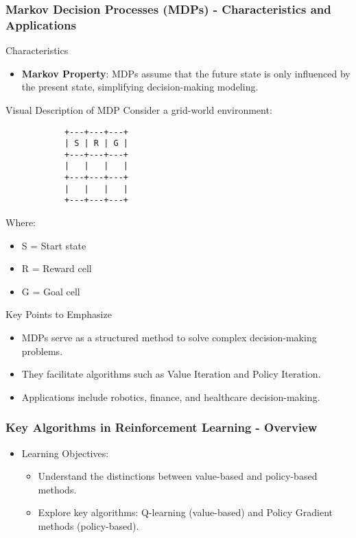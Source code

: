 \documentclass[aspectratio=169]{beamer}
\begin{document}
\begin{frame}[fragile]
    \frametitle{Markov Decision Processes (MDPs) - Characteristics and Applications}
    
    \begin{block}{Characteristics}
        \begin{itemize}
            \item \textbf{Markov Property}: MDPs assume that the future state is only influenced by the present state, simplifying decision-making modeling.
        \end{itemize}
    \end{block}

    \begin{block}{Visual Description of MDP}
        Consider a grid-world environment:
        \begin{center}
            \begin{verbatim}
            +---+---+---+
            | S | R | G |
            +---+---+---+
            |   |   |   |
            +---+---+---+
            |   |   |   |
            +---+---+---+
            \end{verbatim}
        \end{center}
        Where:
        \begin{itemize}
            \item S = Start state
            \item R = Reward cell
            \item G = Goal cell
        \end{itemize}
    \end{block}

    \begin{block}{Key Points to Emphasize}
        \begin{itemize}
            \item MDPs serve as a structured method to solve complex decision-making problems.
            \item They facilitate algorithms such as Value Iteration and Policy Iteration.
            \item Applications include robotics, finance, and healthcare decision-making.
        \end{itemize}
    \end{block}
\end{frame}

\begin{frame}[fragile]
  \frametitle{Key Algorithms in Reinforcement Learning - Overview}
  \begin{itemize}
    \item Learning Objectives:
    \begin{itemize}
      \item Understand the distinctions between value-based and policy-based methods.
      \item Explore key algorithms: Q-learning (value-based) and Policy Gradient methods (policy-based).
    \end{itemize}
  \end{itemize}
\end{frame}
\end{document}
